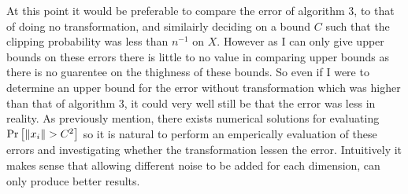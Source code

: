 \documentclass[a4paper,12pt]{article}
\begin{document}
At this point it would be preferable to compare the error of algorithm 3, to that of doing no transformation, and similairly deciding on a bound $C$ 
such that the clipping probability was less than $n^{-1}$ on $X$. However as I can only give upper bounds on these errors there is little to no value in comparing 
upper bounds as there is no guarentee on the thighness of these bounds. So even if I were to determine an upper bound for the error without transformation which was higher than that of algorithm 3, 
it could very well still be that the error was less in reality.
As previously mention, there exists numerical solutions for evaluating $\Pr\left [\|x_i\| > C^2 \right]$ so it is natural to perform an emperically evaluation of these errors
 and investigating whether the transformation lessen the error.
Intuitively it makes sense that allowing different noise to be added for each dimension, can only produce better results.


\end{document}

